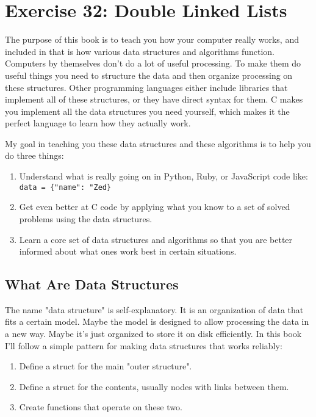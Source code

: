 \chapter{Exercise 32: Double Linked Lists}

The purpose of this book is to teach you how your computer really works, and included in that is
how various data structures and algorithms function.  Computers by themselves don't do a lot of
useful processing.  To make them do useful things you need to structure the data and then
organize processing on these structures.  Other programming languages either include libraries
that implement all of these structures, or they have direct syntax for them.  C makes you
implement all the data structures you need yourself, which makes it the perfect language to
learn how they actually work.

My goal in teaching you these data structures and these algorithms is to help you do three
things:

\begin{enumerate}
\item Understand what is really going on in Python, Ruby, or JavaScript code like: \verb|data = {"name": "Zed}|
\item Get even better at C code by applying what you know to a set of solved problems using the data structures.
\item Learn a core set of data structures and algorithms so that you are better informed about what ones work best in certain situations.
\end{enumerate}


\section{What Are Data Structures}

The name "data structure" is self-explanatory.  It is an organization of data that fits a certain model.  Maybe the model is
designed to allow processing the data in a new way.  Maybe it's just organized to store it on disk efficiently.  In this book
I'll follow a simple pattern for making data structures that works reliably:

\begin{enumerate}
\item Define a struct for the main "outer structure".
\item Define a struct for the contents, usually nodes with links between them.
\item Create functions that operate on these two.
\end{enumerate}

